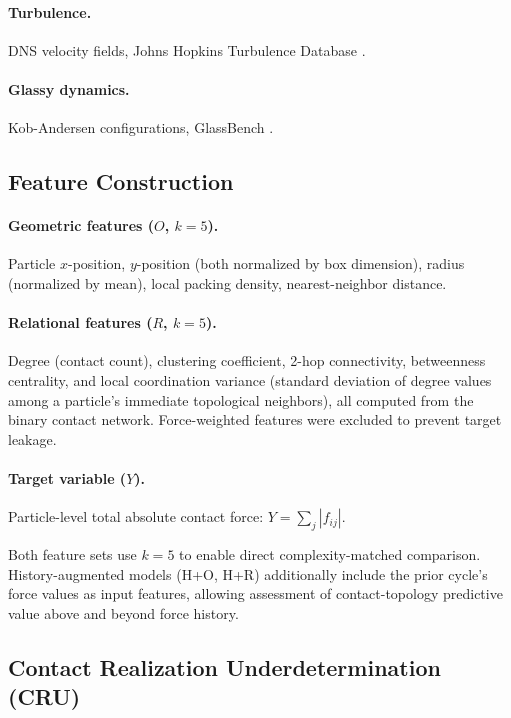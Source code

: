 \documentclass[11pt,a4paper]{article}
\begin{document}
\paragraph{Turbulence.} DNS velocity fields, Johns Hopkins Turbulence Database \cite{li2008jhtdb}.

\paragraph{Glassy dynamics.} Kob-Andersen configurations, GlassBench \cite{bapst2020}.

\subsection{Feature Construction}

\paragraph{Geometric features ($O$, $k=5$).}
Particle $x$-position, $y$-position (both normalized by box dimension), radius (normalized by mean), local packing density, nearest-neighbor distance.

\paragraph{Relational features ($R$, $k=5$).}
Degree (contact count), clustering coefficient, 2-hop connectivity, betweenness centrality, and local coordination variance (standard deviation of degree values among a particle's immediate topological neighbors), all computed from the binary contact network.
Force-weighted features were excluded to prevent target leakage.

\paragraph{Target variable ($Y$).}
Particle-level total absolute contact force: $Y = \sum_j |f_{ij}|$.

Both feature sets use $k=5$ to enable direct complexity-matched comparison. History-augmented models (H+O, H+R) additionally include the prior cycle's force values as input features, allowing assessment of contact-topology predictive value above and beyond force history.

\subsection{Contact Realization Underdetermination (CRU)}
\end{document}

